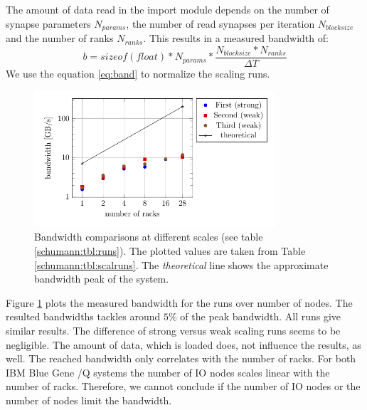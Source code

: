 The amount of data read in the import module depends on the number of synapse parameters $N_{params}$,
the number of read synapses per iteration $N_{blocksize}$ and the number of ranks $N_{ranks}$.
This results in a measured bandwidth of:
\begin{equation}
b = sizeof(float) * N_{params} * \frac{N_{blocksize} * N_{ranks}}{\Delta T}
\label{eq:band}
\end{equation}
We use the equation \ref{eq:band} to normalize the scaling runs.
\begin{figure}[h!]
\begin{center}
 \includegraphics[width=0.8\textwidth]{pgfplots/bandwidth.pdf}
\end{center}
\caption{Bandwidth comparisons at different scales (see table \ref{schumann:tbl:runs}).
The plotted values are taken from Table \ref{schumann:tbl:scalruns}.
The \emph{theoretical} line shows the approximate bandwidth peak of the system.}
\label{schumann:fig:bandwidth}
\end{figure}

Figure \ref{schumann:fig:bandwidth} plots the measured bandwidth for the runs over number of nodes.
The resulted bandwidths tackles around $5\%$ of the peak bandwidth.
All runs give similar results. The difference of strong versus weak scaling runs seems to be negligible.
The amount of data, which is loaded does, not influence the results, as well.
The reached bandwidth only correlates with the number of racks.
For both IBM Blue Gene /Q systems the number of IO nodes scales linear with the number of racks.
Therefore, we cannot conclude if the number of IO nodes or the number of nodes limit the
bandwidth.

